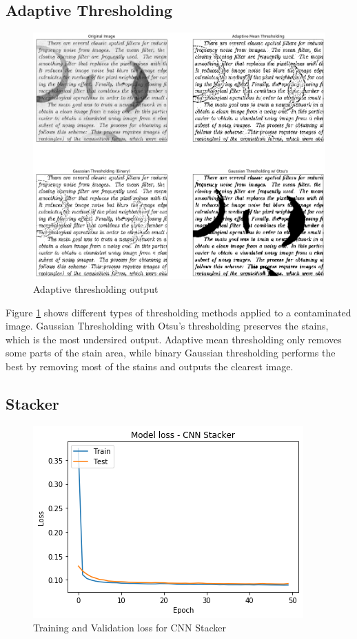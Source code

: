 \documentclass[10pt,twocolumn,letterpaper]{article}
\begin{document}
\subsection{Adaptive Thresholding}
\begin{figure}[h!]
    \centering
    \includegraphics[width=\columnwidth]{images/thresholding.png}
    \caption{Adaptive thresholding output}
    \label{fig:thresholding}
\end{figure}
Figure \ref{fig:thresholding} shows different types of thresholding methods applied to a contaminated image. Gaussian Thresholding with Otsu's thresholding preserves the stains, which is the most undersired output. Adaptive mean thresholding only removes some parts of the stain area, while binary Gaussian thresholding performs the best by removing most of the stains and outputs the clearest image.

\subsection{Stacker}
\begin{figure}[h!]
    \centering
    \includegraphics[width=\columnwidth]{images/stacker_loss_new.png}
    \caption{Training and Validation loss for CNN Stacker}
    \label{fig:stacker_loss}
\end{figure}
\end{document}
